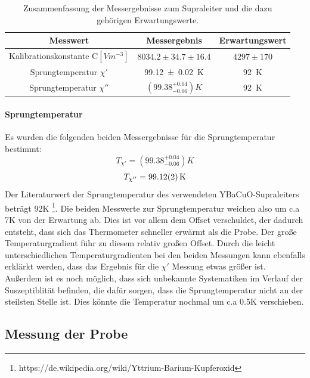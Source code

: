 \documentclass[12pt,a4paper]{article}
\begin{document}
\begin{table}
\centering
\begin{tabular}{|c|c|c|}
\hline 
Messwert & Messergebnis & Erwartungswert \\
\hline 
Kalibrationskonstante C$[\si{Vm^{-3}}]$& $8034.2\pm 34.7\pm 16.4$ & $4297\pm 170$ \\ 
\hline 
Sprungtemperatur $\chi'$ & \SI{99.12\pm 0.02}{K} & \SI{92}{K} \\ 
\hline 
Sprungtemperatur $\chi''$ & $(99.38^{+0.04}_{-0.06}) K$ & \SI{92}{K} \\ 
\hline 
\end{tabular} 
\caption{Zusammenfassung der Messergebnisse zum Supraleiter und die dazu gehörigen Erwartungswerte.}
\label{tab:supra_ergebnis}
\end{table}

\paragraph{Sprungtemperatur}
Es wurden die folgenden beiden Messergebnisse für die Sprungtemperatur bestimmt:
\begin{equation*}
T_{\chi'} = (99.38^{+0.04}_{-0.06}) K
\end{equation*}
\begin{equation*}
T_{\chi''} = \SI{99.12\pm 0.02}{K}
\end{equation*}
Der Literaturwert der Sprungtemperatur des verwendeten YBaCuO-Supraleiters beträgt 92K \footnote{https://de.wikipedia.org/wiki/Yttrium-Barium-Kupferoxid}. Die beiden Messwerte zur Sprungtemperatur weichen also um c.a 7K von der Erwartung ab. Dies ist vor allem dem Offset verschuldet, der dadurch entsteht, dass sich das Thermometer schneller erwärmt als die Probe. Der große Temperaturgradient führ zu diesem relativ großen Offset. Durch die leicht unterschiedlichen Temperaturgradienten bei den beiden Messungen kann ebenfalls erklärkt werden, dass das Ergebnis für die $\chi'$ Messung etwas größer ist. Außerdem ist es noch möglich, dass sich unbekannte Systematiken im Verlauf der Suszeptiblität befinden, die dafür sorgen, dass die Sprungtemperatur nicht an der steilsten Stelle ist. Dies könnte die Temperatur nochmal um c.a 0.5K verschieben.

\newpage
\subsection{Messung der Probe}
\end{document}
